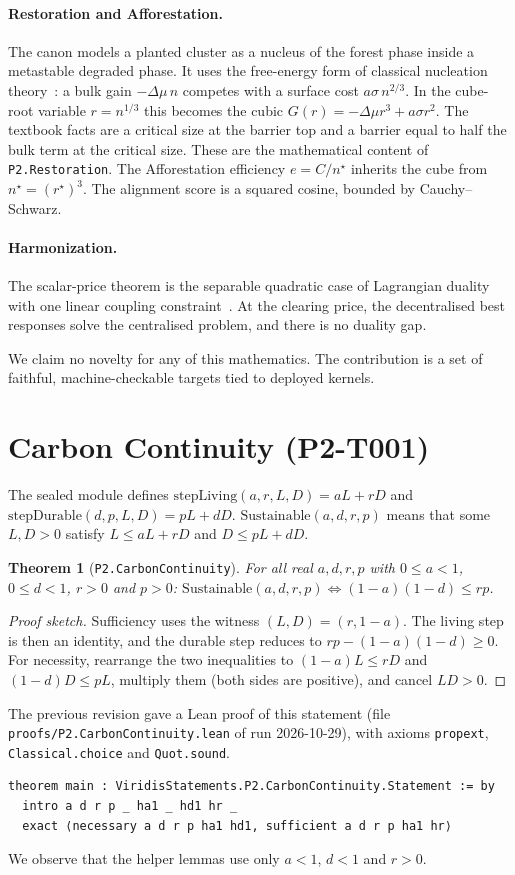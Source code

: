 \documentclass[11pt]{article}
\newtheorem{theorem}{Theorem}
\theoremstyle{definition}
\theoremstyle{remark}
\begin{document}
\paragraph{Restoration and Afforestation.} The canon models a planted cluster as a nucleus of the forest phase inside a
metastable degraded phase. It uses the free-energy form of classical nucleation theory~\cite{Kashchiev2000}:
a bulk gain $-\Delta\mu\, n$ competes with a surface cost $a\sigma\, n^{2/3}$.
In the cube-root variable $r=n^{1/3}$ this becomes the cubic $G(r)=-\Delta\mu r^3+a\sigma r^2$.
The textbook facts are a critical size at the barrier top and a barrier equal to half the bulk term at the critical size.
These are the mathematical content of \texttt{P2.Restoration}.
The Afforestation efficiency $e=C/n^\star$ inherits the cube from $n^\star=(r^\star)^3$.
The alignment score is a squared cosine, bounded by Cauchy--Schwarz.

\paragraph{Harmonization.} The scalar-price theorem is the separable quadratic case of Lagrangian duality with
one linear coupling constraint~\cite{BoydVandenberghe2004}.
At the clearing price, the decentralised best responses solve the centralised problem, and there is no duality gap.

We claim no novelty for any of this mathematics. The contribution is a set of faithful, machine-checkable targets tied
to deployed kernels.

\section{Carbon Continuity (P2-T001)}
The sealed module defines $\mathrm{stepLiving}(a,r,L,D)=aL+rD$ and $\mathrm{stepDurable}(d,p,L,D)=pL+dD$.
$\mathrm{Sustainable}(a,d,r,p)$ means that some $L,D>0$ satisfy $L\le aL+rD$ and $D\le pL+dD$.
\begin{theorem}[\texttt{P2.CarbonContinuity}]
For all real $a,d,r,p$ with $0\le a<1$, $0\le d<1$, $r>0$ and $p>0$:
$\mathrm{Sustainable}(a,d,r,p)\iff (1-a)(1-d)\le rp$.
\end{theorem}
\begin{proof}[Proof sketch]
Sufficiency uses the witness $(L,D)=(r,1-a)$. The living step is then an identity, and the durable step reduces to
$rp-(1-a)(1-d)\ge 0$. For necessity, rearrange the two inequalities to $(1-a)L\le rD$ and $(1-d)D\le pL$,
multiply them (both sides are positive), and cancel $LD>0$.
\end{proof}
The previous revision gave a Lean proof of this statement (file \texttt{proofs/P2.CarbonContinuity.lean} of run
2026-10-29), with axioms \texttt{propext}, \texttt{Classical.choice} and \texttt{Quot.sound}.
\begin{lstlisting}
theorem main : ViridisStatements.P2.CarbonContinuity.Statement := by
  intro a d r p _ ha1 _ hd1 hr _
  exact ⟨necessary a d r p ha1 hd1, sufficient a d r p ha1 hr⟩
\end{lstlisting}
We observe that the helper lemmas use only $a<1$, $d<1$ and $r>0$.
\end{document}
